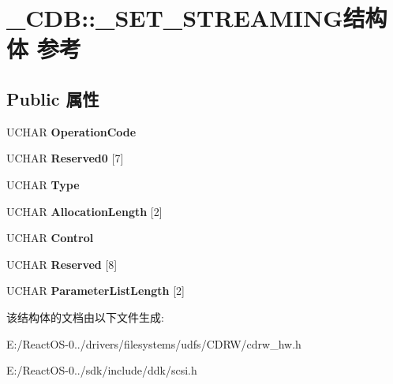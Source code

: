 \hypertarget{struct___c_d_b_1_1___s_e_t___s_t_r_e_a_m_i_n_g}{}\section{\+\_\+\+C\+DB\+:\+:\+\_\+\+S\+E\+T\+\_\+\+S\+T\+R\+E\+A\+M\+I\+N\+G结构体 参考}
\label{struct___c_d_b_1_1___s_e_t___s_t_r_e_a_m_i_n_g}
\subsection*{Public 属性}
\begin{DoxyCompactItemize}
\item 
\mbox{\label{struct___c_d_b_1_1___s_e_t___s_t_r_e_a_m_i_n_g_a2a567a558d9b5ad8093a035c5cc8a25b}} 
U\+C\+H\+AR {\bfseries Operation\+Code}
\item 
\mbox{\label{struct___c_d_b_1_1___s_e_t___s_t_r_e_a_m_i_n_g_affaf236905d7181458012f374e562c7f}} 
U\+C\+H\+AR {\bfseries Reserved0} \mbox{[}7\mbox{]}
\item 
\mbox{\label{struct___c_d_b_1_1___s_e_t___s_t_r_e_a_m_i_n_g_a79bc3869c6ab1d8dd47ae1a3603ee086}} 
U\+C\+H\+AR {\bfseries Type}
\item 
\mbox{\label{struct___c_d_b_1_1___s_e_t___s_t_r_e_a_m_i_n_g_a48a3f15ea915fd7bddfcc787264b1ef0}} 
U\+C\+H\+AR {\bfseries Allocation\+Length} \mbox{[}2\mbox{]}
\item 
\mbox{\label{struct___c_d_b_1_1___s_e_t___s_t_r_e_a_m_i_n_g_aed22e2476c527f1011d5d6cb66d704c9}} 
U\+C\+H\+AR {\bfseries Control}
\item 
\mbox{\label{struct___c_d_b_1_1___s_e_t___s_t_r_e_a_m_i_n_g_ab86276b60002e7b9377f6060c6a83d96}} 
U\+C\+H\+AR {\bfseries Reserved} \mbox{[}8\mbox{]}
\item 
\mbox{\label{struct___c_d_b_1_1___s_e_t___s_t_r_e_a_m_i_n_g_a4b508c9a363aecf619ec8db41ae4983c}} 
U\+C\+H\+AR {\bfseries Parameter\+List\+Length} \mbox{[}2\mbox{]}
\end{DoxyCompactItemize}


该结构体的文档由以下文件生成\+:\begin{DoxyCompactItemize}
\item 
E\+:/\+React\+O\+S-\/0../drivers/filesystems/udfs/\+C\+D\+R\+W/cdrw\+\_\+hw.\+h\item 
E\+:/\+React\+O\+S-\/0../sdk/include/ddk/scsi.\+h\end{DoxyCompactItemize}
